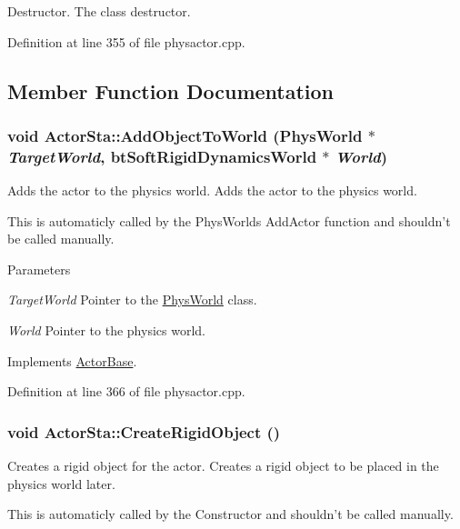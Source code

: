Destructor. The class destructor. 

Definition at line 355 of file physactor.cpp.

\subsection{Member Function Documentation}
\hypertarget{classActorSta_acd11f1ee404ab71d49d8fd4a810f2931}{
\subsubsection[{AddObjectToWorld}]{\setlength{\rightskip}{0pt plus 5cm}void ActorSta::AddObjectToWorld ({\bf PhysWorld} $\ast$ {\em TargetWorld}, \/  btSoftRigidDynamicsWorld $\ast$ {\em World})}}
\label{d3/daf/classActorSta_acd11f1ee404ab71d49d8fd4a810f2931}


Adds the actor to the physics world. Adds the actor to the physics world. \par
 This is automaticly called by the PhysWorlds AddActor function and shouldn't be called manually. 
\begin{DoxyParams}{Parameters}
\item[{\em TargetWorld}]Pointer to the \hyperlink{classPhysWorld}{PhysWorld} class. \item[{\em World}]Pointer to the physics world. \end{DoxyParams}


Implements \hyperlink{classActorBase_a1af82a2ed960fd114518fdf84d5ff146}{ActorBase}.

Definition at line 366 of file physactor.cpp.\hypertarget{classActorSta_ae856b69de748541606649d21d2e6c270}{
\subsubsection[{CreateRigidObject}]{\setlength{\rightskip}{0pt plus 5cm}void ActorSta::CreateRigidObject ()}}
\label{d3/daf/classActorSta_ae856b69de748541606649d21d2e6c270}


Creates a rigid object for the actor. Creates a rigid object to be placed in the physics world later. \par
 This is automaticly called by the Constructor and shouldn't be called manually. 

